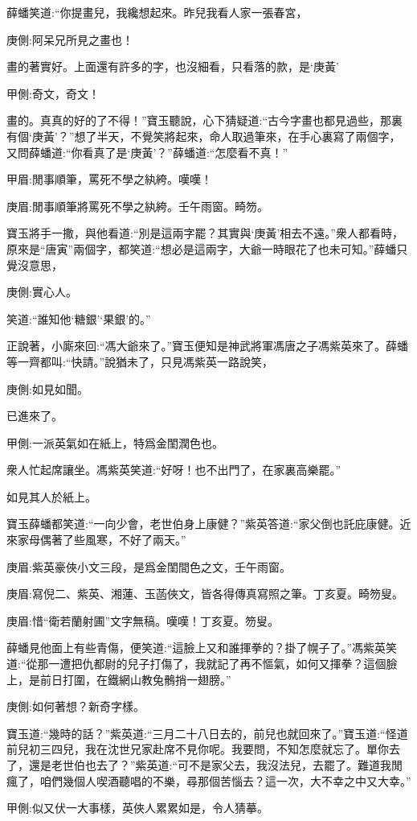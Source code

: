 \begin{parag}
    薛蟠笑道:“你提畫兒，我纔想起來。昨兒我看人家一張春宮，\begin{note}庚側:阿呆兄所見之畫也！\end{note}畫的著實好。上面還有許多的字，也沒細看，只看落的款，是‘庚黃’\begin{note}甲側:奇文，奇文！\end{note}畫的。真真的好的了不得！”寶玉聽說，心下猜疑道:“古今字畫也都見過些，那裏有個‘庚黃’？”想了半天，不覺笑將起來，命人取過筆來，在手心裏寫了兩個字，又問薛蟠道:“你看真了是‘庚黃’？”薛蟠道:“怎麼看不真！”\begin{note}甲眉:閒事順筆，罵死不學之紈絝。嘆嘆！\end{note}\begin{note}庚眉:閒事順筆將罵死不學之紈絝。壬午雨窗。畸笏。\end{note}寶玉將手一撒，與他看道:“別是這兩字罷？其實與‘庚黃’相去不遠。”衆人都看時，原來是“唐寅”兩個字，都笑道:“想必是這兩字，大爺一時眼花了也未可知。”薛蟠只覺沒意思，\begin{note}庚側:實心人。\end{note}笑道:“誰知他‘糖銀’‘果銀’的。”
\end{parag}


\begin{parag}
    正說著，小廝來回:“馮大爺來了。”寶玉便知是神武將軍馮唐之子馮紫英來了。薛蟠等一齊都叫:“快請。”說猶未了，只見馮紫英一路說笑，\begin{note}庚側:如見如聞。\end{note}已進來了。\begin{note}甲側:一派英氣如在紙上，特爲金閨潤色也。\end{note}衆人忙起席讓坐。馮紫英笑道:“好呀！也不出門了，在家裏高樂罷。”\begin{note}如見其人於紙上。\end{note}寶玉薛蟠都笑道:“一向少會，老世伯身上康健？”紫英答道:“家父倒也託庇康健。近來家母偶著了些風寒，不好了兩天。”\begin{note}庚眉:紫英豪俠小文三段，是爲金閨間色之文，壬午雨窗。\end{note}\begin{note}庚眉:寫倪二、紫英、湘蓮、玉菡俠文，皆各得傳真寫照之筆。丁亥夏。畸笏叟。\end{note}\begin{note}庚眉:惜“衛若蘭射圃”文字無稿。嘆嘆！丁亥夏。笏叟。\end{note}薛蟠見他面上有些青傷，便笑道:“這臉上又和誰揮拳的？掛了幌子了。”馮紫英笑道:“從那一遭把仇都尉的兒子打傷了，我就記了再不慪氣，如何又揮拳？這個臉上，是前日打圍，在鐵網山教兔鶻捎一翅膀。”\begin{note}庚側:如何著想？新奇字樣。\end{note}寶玉道:“幾時的話？”紫英道:“三月二十八日去的，前兒也就回來了。”寶玉道:“怪道前兒初三四兒，我在沈世兄家赴席不見你呢。我要問，不知怎麼就忘了。單你去了，還是老世伯也去了？”紫英道:“可不是家父去，我沒法兒，去罷了。難道我閒瘋了，咱們幾個人喫酒聽唱的不樂，尋那個苦惱去？這一次，大不幸之中又大幸。”\begin{note}甲側:似又伏一大事樣，英俠人累累如是，令人猜摹。\end{note}
\end{parag}


